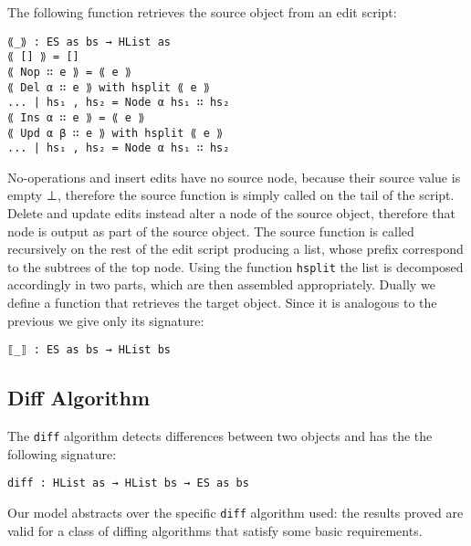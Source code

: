 \documentclass{sigplanconf}
\theoremstyle{plain}
\begin{document}
	The following function retrieves the source object from an edit 
        script:			
\begin{verbatim}
⟪_⟫ : ES as bs → HList as
⟪ [] ⟫ = []
⟪ Nop ∷ e ⟫ = ⟪ e ⟫
⟪ Del α ∷ e ⟫ with hsplit ⟪ e ⟫
... | hs₁ , hs₂ = Node α hs₁ ∷ hs₂
⟪ Ins α ∷ e ⟫ = ⟪ e ⟫
⟪ Upd α β ∷ e ⟫ with hsplit ⟪ e ⟫
... | hs₁ , hs₂ = Node α hs₁ ∷ hs₂
\end{verbatim}
	No-operations and insert edits have no source node,
        because their source value is empty ⊥, therefore
        the source function is simply called on the tail
        of the script.
        Delete and update edits instead alter a node of the source
        object, therefore that node is output as part of the source
        object.
        The source function is called recursively on the rest of the
        edit script producing a list, whose prefix correspond to the
        subtrees of the top node. Using the function \texttt{hsplit}
        the list is decomposed accordingly in two parts, which are
        then assembled appropriately.
	Dually we define a function that retrieves the target object.
	Since it is analogous to the previous we give only its signature:
	
\begin{verbatim}
⟦_⟧ : ES as bs → HList bs
\end{verbatim}

\subsection{Diff Algorithm}
\label{subsec:diff-algo}
The \texttt{diff} algorithm detects differences between two objects
and has the the following signature: 
\begin{verbatim}
diff : HList as → HList bs → ES as bs
\end{verbatim}
Our model abstracts over the specific \texttt{diff} algorithm used:
the results proved are valid for a class of diffing algorithms that
satisfy some basic requirements.
\end{document}
